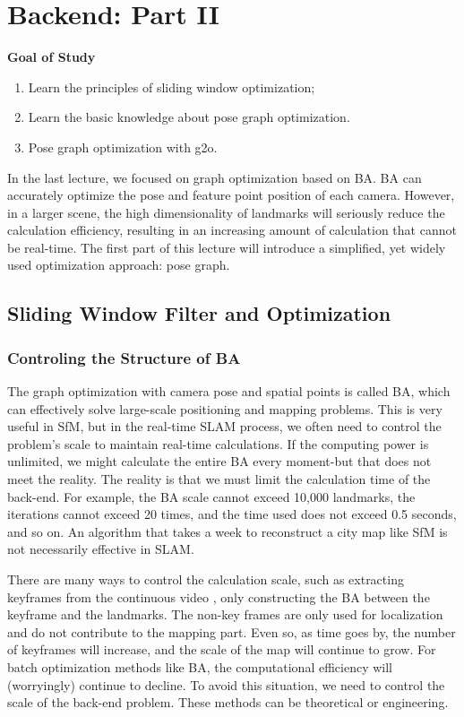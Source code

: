 \chapter{Backend: Part II}
\label{cpt:backend2}
\begin{mdframed}  
	\textbf{Goal of Study}
	\begin{enumerate}[labelindent=0em,leftmargin=1.5em]
		\item Learn the principles of sliding window optimization; 
		\item Learn the basic knowledge about pose graph optimization.
		\item Pose graph optimization with g2o. 
	\end{enumerate}
\end{mdframed}

In the last lecture, we focused on graph optimization based on BA. BA can accurately optimize the pose and feature point position of each camera. However, in a larger scene, the high dimensionality of landmarks will seriously reduce the calculation efficiency, resulting in an increasing amount of calculation that cannot be real-time. The first part of this lecture will introduce a simplified, yet widely used optimization approach: pose graph.

\newpage
\section{Sliding Window Filter and Optimization}
\subsection{Controling the Structure of BA}

The graph optimization with camera pose and spatial points is called BA, which can effectively solve large-scale positioning and mapping problems. This is very useful in SfM, but in the real-time SLAM process, we often need to control the problem's scale to maintain real-time calculations. If the computing power is unlimited, we might calculate the entire BA every moment-but that does not meet the reality. The reality is that we must limit the calculation time of the back-end. For example, the BA scale cannot exceed 10,000 landmarks, the iterations cannot exceed 20 times, and the time used does not exceed 0.5 seconds, and so on. An algorithm that takes a week to reconstruct a city map like SfM is not necessarily effective in SLAM.

There are many ways to control the calculation scale, such as extracting keyframes from the continuous video \cite{Leutenegger2015}, only constructing the BA between the keyframe and the landmarks. The non-key frames are only used for localization and do not contribute to the mapping part. Even so, as time goes by, the number of keyframes will increase, and the scale of the map will continue to grow. For batch optimization methods like BA, the computational efficiency will (worryingly) continue to decline. To avoid this situation, we need to control the scale of the back-end problem. These methods can be theoretical or engineering.

